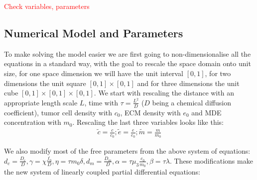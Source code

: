 \textcolor{red}{Check variables, parameters}

\subsection{Numerical Model and Parameters}

To make solving the model easier we are first going to non-dimensionalise all the equations in a standard way, with the goal to rescale the space domain onto unit size, for one space dimension we will have the unit interval $[0,1]$, for two dimensions the unit square $[0,1] \times [0,1]$ and for three dimensions the unit cube $[0,1] \times [0,1] \times [0,1]$. 
We start with rescaling the distance with an appropriate length scale $L$, time with $\tau = \frac{L^2}{D}$ ($D$ being a chemical diffusion coefficient), tumor cell density with $c_0$, ECM density with $e_0$ and MDE concentration with $m_0$. Rescaling the last three variables looks like this:
\begin{align*}
    \tilde{c} = \frac{c}{c_0};  \tilde{e} = \frac{e}{e_0};  \tilde{m} = \frac{m}{m_0}  
\end{align*}

We also modify most of the free parameters from the above system of equations: $d_c = \frac{D_c}{D}, \gamma = \chi \frac{f_0}{D}, \eta = \tau m_0 \delta, d_m = \frac{D_m}{D}, \alpha = \tau \mu_3 \frac{c_0}{m_0}, \beta = \tau \lambda$. \newline 
These modifications make the new system of linearly coupled partial differential equations:

